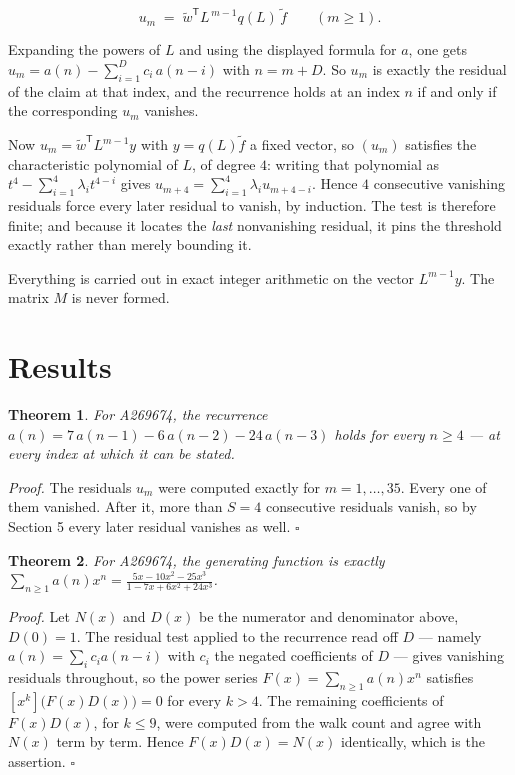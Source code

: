 \documentclass[11pt]{article}
\newtheorem{theorem}{Theorem}
\theoremstyle{definition}
\begin{document}
\[u_m \;=\; \tilde w^{\mathsf T} L^{\,m-1} q(L)\,\tilde f \qquad (m \ge 1).\]

Expanding the powers of $L$ and using the displayed formula for $a$, one gets $u_m = a(n) - \sum_{i=1}^{D} c_i\,a(n-i)$ with $n = m + D$. So $u_m$ is exactly the residual of the claim at that index, and the recurrence holds at an index $n$ if and only if the corresponding $u_m$ vanishes.

Now $u_m = \tilde w^{\mathsf T} L^{m-1} y$ with $y = q(L)\tilde f$ a fixed vector, so $(u_m)$ satisfies the characteristic polynomial of $L$, of degree $4$: writing that polynomial as $t^{4} - \sum_{i=1}^{4} \lambda_i t^{4-i}$ gives $u_{m+4} = \sum_{i=1}^{4} \lambda_i u_{m+4-i}$. Hence $4$ consecutive vanishing residuals force every later residual to vanish, by induction. The test is therefore finite; and because it locates the {\itshape last} nonvanishing residual, it pins the threshold exactly rather than merely bounding it.

Everything is carried out in exact integer arithmetic on the vector $L^{m-1}y$. The matrix $M$ is never formed.

\section{Results}

\begin{theorem} For A269674, the recurrence $a(n) = 7\,a(n-1) - 6\,a(n-2) - 24\,a(n-3)$ holds for every $n \ge 4$ --- at every index at which it can be stated.\end{theorem}

{\itshape Proof.} The residuals $u_m$ were computed exactly for $m = 1,\dots,35$. Every one of them vanished. After it, more than $S = 4$ consecutive residuals vanish, so by Section 5 every later residual vanishes as well. $\square$

\begin{theorem} For A269674, the generating function is exactly $\sum_{n\ge 1} a(n)x^n = \frac{5x - 10x^{2} - 25x^{3}}{1 - 7x + 6x^{2} + 24x^{3}}$.\end{theorem}

{\itshape Proof.} Let $N(x)$ and $D(x)$ be the numerator and denominator above, $D(0)=1$. The residual test applied to the recurrence read off $D$ --- namely $a(n) = \sum_i c_i a(n-i)$ with $c_i$ the negated coefficients of $D$ --- gives vanishing residuals throughout, so the power series $F(x)=\sum_{n\ge 1}a(n)x^n$ satisfies $[x^k]\bigl(F(x)D(x)\bigr) = 0$ for every $k > 4$. The remaining coefficients of $F(x)D(x)$, for $k \le 9$, were computed from the walk count and agree with $N(x)$ term by term. Hence $F(x)D(x) = N(x)$ identically, which is the assertion. $\square$
\end{document}
